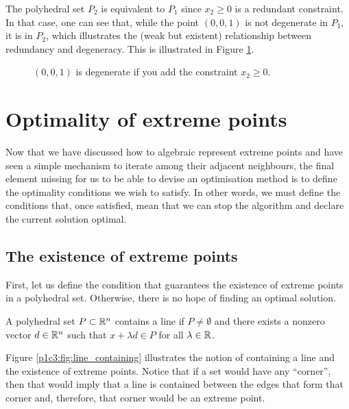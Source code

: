 %
The polyhedral set $P_2$ is equivalent to $P_1$ since $x_2 \ge 0$ is a redundant constraint. In that case, one can see that, while the point $(0,0,1)$ is not degenerate in $P_1$, it is in $P_2$, which illustrates the (weak but existent) relationship between redundancy and degeneracy. This is illustrated in Figure \ref{p1c3:fig:redundancy_and_degeneration}.
%
\begin{figure}[h]
    \caption{$(0,0,1)$ is degenerate if you add the constraint $x_2 \ge 0$.} \label{p1c3:fig:redundancy_and_degeneration}
\end{figure}


\section{Optimality of extreme points}

Now that we have discussed how to algebraic represent extreme points and have seen a simple mechanism to iterate among their adjacent neighbours, the final element missing for us to be able to devise an optimisation method is to define the optimality conditions we wish to satisfy. In other words, we must define the conditions that, once satisfied, mean that we can stop the algorithm and declare the current solution optimal.


\subsection{The existence of extreme points}

First, let us define the condition that guarantees the existence of extreme points in a polyhedral set. Otherwise, there is no hope of finding an optimal solution.

\begin{definition}\label{p1c3:def:line_containing}
	A polyhedral set $P \subset \mathbb{R}^n$ contains a line if $P \neq \emptyset$ and there exists a nonzero vector $d \in \mathbb{R}^n$ such that $x + \lambda d \in P$ for all $\lambda \in \mathbb{R}$.
\end{definition}

Figure \ref{p1c3:fig:line_containing} illustrates the notion of containing a line and the existence of extreme points. Notice that if a set would have any ``corner'', then that would imply that a line is contained between the edges that form that corner and, therefore, that corner would be an extreme point.

